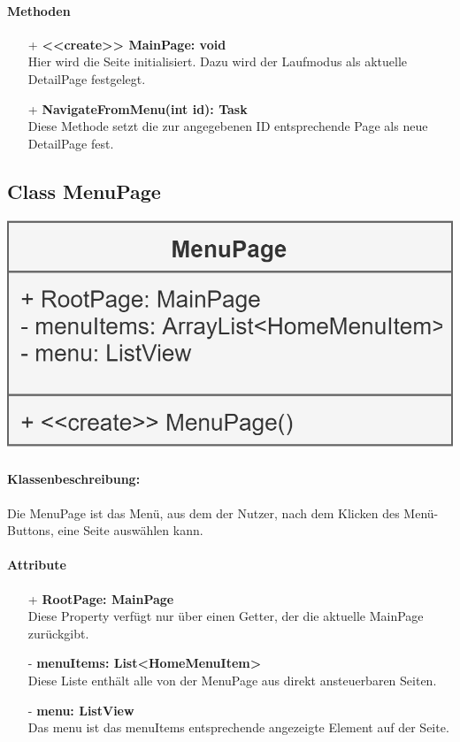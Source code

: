 \documentclass[a4paper,12pt]{article}
\begin{document}
		\paragraph{Methoden}
		\begin{itemize}
			\item [+] \textbf{<<create>> MainPage: void}\\ Hier wird die Seite initialisiert. Dazu wird der Laufmodus als aktuelle DetailPage festgelegt.
			\item [+] \textbf{NavigateFromMenu(int id): Task}\\ Diese Methode setzt die zur angegebenen ID entsprechende Page als neue DetailPage fest.
		\end{itemize}
	\begin{minipage}[b]{0.7\textwidth}

		\subsection{Class MenuPage}
	\end{minipage}
	\begin{minipage}[c]{0.3\textwidth}
		\includegraphics[width=\textwidth]{bilder/ViewKlassen/MenuPage.png}
	\end{minipage}
		\paragraph{Klassenbeschreibung:}
		Die MenuPage ist das Menü, aus dem der Nutzer, nach dem Klicken des Menü-Buttons, eine Seite auswählen kann.
		\paragraph{Attribute}
		\begin{itemize}
			\item [+] \textbf{RootPage: MainPage}\\ Diese Property verfügt nur über einen Getter, der die aktuelle MainPage zurückgibt.
			\item [-] \textbf{menuItems: List<HomeMenuItem>}\\ Diese Liste enthält alle von der MenuPage aus direkt ansteuerbaren Seiten.
			\item [-] \textbf{menu: ListView}\\ Das menu ist das menuItems entsprechende angezeigte Element auf der Seite.		
		\end{itemize}
\end{document}
